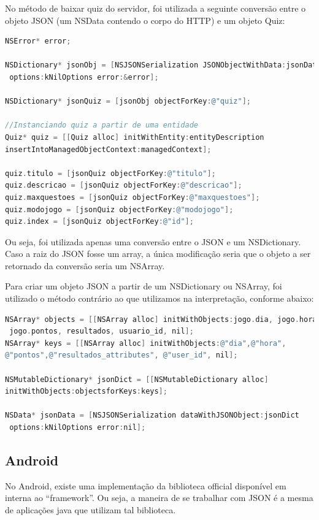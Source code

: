			No método de baixar quiz do servidor, foi utilizada a seguinte conversão entre o objeto \ac{JSON} (um NSData contendo o corpo do \ac{HTTP}) e um objeto Quiz:
\begin{lstlisting}[language=C]   
NSError* error;
     
NSDictionary* jsonObj = [NSJSONSerialization JSONObjectWithData:jsonData
 options:kNilOptions error:&error];
     
NSDictionary* jsonQuiz = [jsonObj objectForKey:@"quiz"];
     
//Instanciando quiz a partir de uma entidade
Quiz* quiz = [[Quiz alloc] initWithEntity:entityDescription 
insertIntoManagedObjectContext:managedContext];
     
quiz.titulo = [jsonQuiz objectForKey:@"titulo"];
quiz.descricao = [jsonQuiz objectForKey:@"descricao"];
quiz.maxquestoes = [jsonQuiz objectForKey:@"maxquestoes"];
quiz.modojogo = [jsonQuiz objectForKey:@"modojogo"];
quiz.index = [jsonQuiz objectForKey:@"id"];
 \end{lstlisting}       
            
			Ou seja, foi utilizada apenas uma conversão entre o \ac{JSON} e um NSDictionary. Caso a raiz do \ac{JSON} fosse um array, a única modificação seria que o objeto a ser retornado da conversão seria um NSArray.
            
			Para criar um objeto \ac{JSON} a partir de um NSDictionary ou NSArray, foi utilizado o método contrário ao que utilizamos na interpretação, conforme abaixo:
\begin{lstlisting}[language=C]   
NSArray* objects = [[NSArray alloc] initWithObjects:jogo.dia, jogo.hora,
 jogo.pontos, resultados, usuario_id, nil];
NSArray* keys = [[NSArray alloc] initWithObjects:@"dia",@"hora",
@"pontos",@"resultados_attributes", @"user_id", nil];
     
NSMutableDictionary* jsonDict = [[NSMutableDictionary alloc] 
initWithObjects:objectsforKeys:keys];
     
NSData* jsonData = [NSJSONSerialization dataWithJSONObject:jsonDict
 options:kNilOptions error:nil];
 \end{lstlisting}       
    \subsection{Android}
     
            No Android, existe uma implementação da biblioteca official disponível em \cite{json} interna ao ``framework''. Ou seja, a maneira de se trabalhar com \ac{JSON} é a mesma de aplicações java que utilizam tal biblioteca.
           
